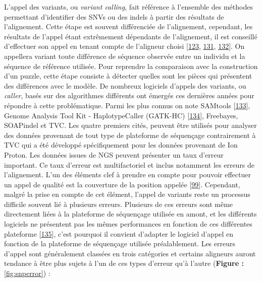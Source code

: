 \documentclass[12pt,twoside]{reedthesis}
\theoremstyle{definition}
\theoremstyle{definition}
\theoremstyle{remark}
\begin{document}
  L'appel des variants, ou \emph{variant calling}, fait référence à
  l'ensemble des méthodes permettant d'identifier des SNVs ou des indels à
  partir des résultats de l'alignement. Cette étape est souvent
  différenciée de l'alignement, cependant, les résultats de l'appel étant
  extrêmement dépendants de l'alignement, il est conseillé d'effectuer son
  appel en tenant compte de l'aligneur choisi
  {[}\protect\hyperlink{ref-Nielsen2011}{123},
  \protect\hyperlink{ref-DePristo2011}{131},
  \protect\hyperlink{ref-Lunter2011}{132}{]}. On appellera variant toute
  différence de séquence observée entre un individu et la séquence de
  référence utilisée. Pour reprendre la comparaison avec la construction
  d'un puzzle, cette étape consiste à détecter quelles sont les pièces qui
  présentent des différences avec le modèle. De nombreux logiciels
  d'appels des variants, ou \emph{caller}, basés sur des algorithmes
  différents ont émergés ces dernières années pour répondre à cette
  problématique. Parmi les plus connus on note SAMtools
  {[}\protect\hyperlink{ref-Li2009}{133}{]}, Genome Analysis Tool Kit -
  HaplotypeCaller (GATK-HC)
  {[}\protect\hyperlink{ref-McKenna2010}{134}{]}, Freebayes, SOAPindel et
  TVC. Les quatre premiers cités, peuvent être utilisés pour analyser des
  données provenant de tout type de plateforme de séquençage contrairement
  à TVC qui a été développé spécifiquement pour les données provenant de
  Ion Proton. Les données issues de NGS peuvent présenter un taux d'erreur
  important. Ce taux d'erreur est multifactoriel et inclus notamment les
  erreurs de l'alignement. L'un des éléments clef à prendre en compte pour
  pouvoir effectuer un appel de qualité est la couverture de la position
  appelée {[}\protect\hyperlink{ref-Sims2014}{99}{]}. Cependant, malgré la
  prise en compte de cet élément, l'appel de variants reste un processus
  difficile souvent lié à plusieurs erreurs. Plusieurs de ces erreurs sont
  même directement liées à la plateforme de séquençage utilisée en amont,
  et les différents logiciels ne présentent pas les mêmes performances en
  fonction de ces différentes plateforme
  {[}\protect\hyperlink{ref-Hwang2015}{135}{]}, c'est pourquoi il convient
  d'adapter le logiciel d'appel en fonction de la plateforme de séquençage
  utilisée préalablement. Les erreurs d'appel sont généralement classées
  en trois catégories et certains aligneurs auront tendance à être plus
  sujets à l'un de ces types d'erreur qu'à l'autre (\textbf{Figure :
  }\ref{fig:snperror}) :
  
\end{document}
